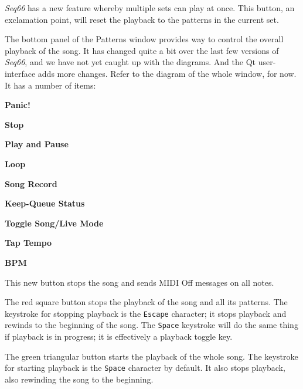    \textsl{Seq66} has a new feature whereby multiple sets can play at once.
   This button, an exclamation point, will reset the playback to the patterns
   in the current set.

   The bottom panel of the Patterns window provides way to control the
   overall playback of the song.  It has changed quite a bit over the last few
   versions of \textsl{Seq66}, and we have not yet caught up with the
   diagrams. And the Qt user-interface adds more changes.
   Refer to the diagram of the whole window, for now.
   It has a number of items:

   \begin{enumber}
      \item \textbf{Panic!}
      \item \textbf{Stop}
      \item \textbf{Play and Pause}
      \item \textbf{Loop}
      \item \textbf{Song Record}
      \item \textbf{Keep-Queue Status}
      \item \textbf{Toggle Song/Live Mode}
      \item \textbf{Tap Tempo}
      \item \textbf{BPM}
   \end{enumber}

   \setcounter{ItemCounter}{0}      %

   This new button stops the song and sends MIDI Off messages on all notes.

   The red square button stops the playback of the song and all its patterns.
   The keystroke for stopping playback is the \texttt{Escape} character; it
   stops playback and rewinds to the beginning of the song.
   The \texttt{Space} keystroke will do the same thing if playback is in
   progress; it is effectively a playback toggle key.

   The green triangular button starts the playback of the whole song.
   The keystroke for starting playback is the \texttt{Space} character by
   default.  It also stops playback, also rewinding the song to the beginning.

